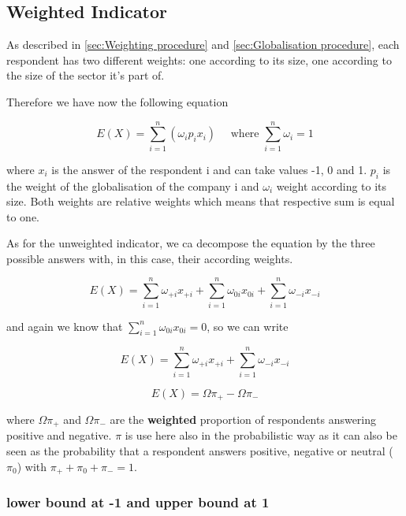 \documentclass[12pt,a4paper,oneside]{book}
\begin{document}
\subsection{Weighted Indicator}

As described in \autoref{sec:Weighting procedure} and \autoref{sec:Globalisation procedure}, each respondent has two different weights: one according to its size, one according to the size of the sector it's part of.

Therefore we have now the following equation


\begin{equation}
    E(X) = \sum_{i=1}^n \left(\omega_i p_i x_i \right) \quad \text{  where  } \sum_{i=1}^n \omega_i =  1
\end{equation} 

where
$x_i$ is the answer of the respondent i and can take values -1, 0 and 1.
$p_i$ is the weight of the globalisation of the company i and 
$\omega_i$ weight according to its size. Both weights are relative weights which means that respective sum is equal to one.

As for the unweighted indicator, we ca decompose the equation by the three possible answers with, in this case, their according weights.

\begin{equation}
    E(X) = \sum_{i=1}^n \omega_{+i} x_{+i} + \sum_{i=1}^n \omega_{0i} x_{0i} + \sum_{i=1}^n \omega_{-i} x_{-i}
\end{equation}

and again we know that $\sum_{i=1}^n \omega_{0i} x_{0i} = 0$, so we can write

\begin{equation}
    E(X) = \sum_{i=1}^n \omega_{+i} x_{+i} + \sum_{i=1}^n \omega_{-i} x_{-i}
\end{equation} 

\begin{equation}
    E(X) = \Omega \pi_+ - \Omega \pi_-
\end{equation}

where $\Omega \pi_+$ and $\Omega \pi_-$ are the \textbf{weighted} proportion of respondents answering positive and negative. $\pi$ is use here also in the probabilistic way as it can also be seen as the probability that a respondent answers positive, negative or neutral ($\pi_0$) with $\pi_+ + \pi_0 + \pi_- =1$.



\subsubsection{lower bound at -1 and upper bound at 1}
\end{document}
